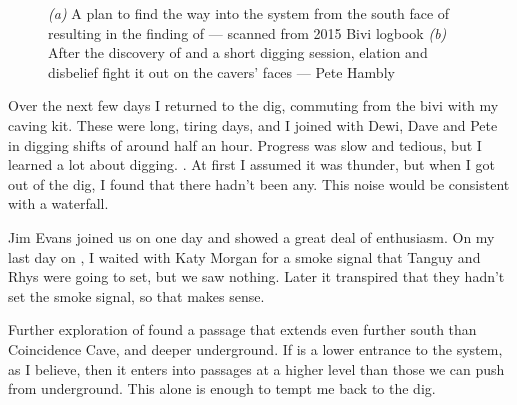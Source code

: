\begin{figure}[t!]
        \caption{
            \textsl{(a)} A plan to find the way into the system from the south face of  resulting in the finding of  --- scanned from 2015 Bivi logbook
            \textsl{(b)} After the discovery of  and a short digging session, elation and disbelief fight it out on the cavers' faces --- Pete Hambly}
        \label{}

    \end{figure}

	Over the next few days I returned to the dig, commuting from the bivi with my caving kit. These were long, tiring days, and I joined with Dewi, Dave and Pete in digging shifts of around half an hour. Progress was slow and tedious, but I learned a lot about digging. . At first I assumed it was thunder, but when I got out of the dig, I found that there hadn't been any. This noise would be consistent with a waterfall.

    Jim Evans joined us on one day and showed a great deal of enthusiasm. On my last day on , I waited with Katy Morgan for a smoke signal that Tanguy and Rhys were going to set, but we saw nothing. Later it transpired that they hadn't set the smoke signal, so that makes sense.

    Further exploration of  found a passage that extends even further south than Coincidence Cave, and deeper underground. If  is a lower entrance to the system, as I believe, then it enters into passages at a higher level than those we can push from underground. This alone is enough to tempt me back to the dig.

